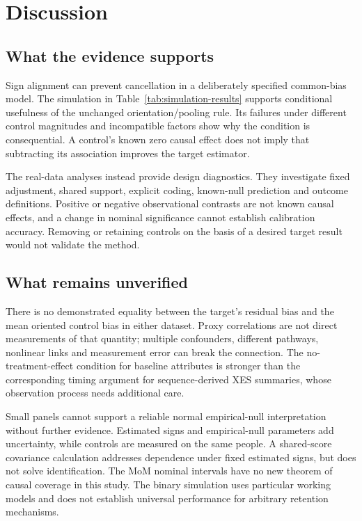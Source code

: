 \section{Discussion}

\subsection{What the evidence supports}

Sign alignment can prevent cancellation in a deliberately specified common-bias model. The simulation in Table~\ref{tab:simulation-results} supports conditional usefulness of the unchanged orientation/pooling rule. Its failures under different control magnitudes and incompatible factors show why the condition is consequential. A control's known zero causal effect does not imply that subtracting its association improves the target estimator.



The real-data analyses instead provide design diagnostics. They investigate fixed adjustment, shared support, explicit coding, known-null prediction and outcome definitions. Positive or negative observational contrasts are not known causal effects, and a change in nominal significance cannot establish calibration accuracy. Removing or retaining controls on the basis of a desired target result would not validate the method.

\subsection{What remains unverified}

There is no demonstrated equality between the target's residual bias and the mean oriented control bias in either dataset. Proxy correlations are not direct measurements of that quantity; multiple confounders, different pathways, nonlinear links and measurement error can break the connection. The no-treatment-effect condition for baseline attributes is stronger than the corresponding timing argument for sequence-derived XES summaries, whose observation process needs additional care.

Small panels cannot support a reliable normal empirical-null interpretation without further evidence. Estimated signs and empirical-null parameters add uncertainty, while controls are measured on the same people. A shared-score covariance calculation addresses dependence under fixed estimated signs, but does not solve identification. The MoM nominal intervals have no new theorem of causal coverage in this study. The binary simulation uses particular working models and does not establish universal performance for arbitrary retention mechanisms.

